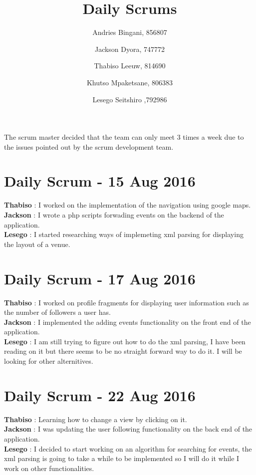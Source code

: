 \documentclass[10pt,a4paper]{article}
\title{Daily Scrums}
\author{
  Andries Bingani, 856807 \and
  Jackson Dyora, 747772\and
  Thabiso Leeuw, 814690 \and
  Khutso Mpaketsane, 806383 \and
  Lesego Seitshiro ,792986
}
\begin{document}
\maketitle

The scrum master decided that the team can only meet 3 times a week due to the issues pointed out by the scrum development team.

\section{Daily Scrum - 15 Aug 2016}
\textbf{Thabiso} : I worked on the implementation of the navigation using google maps.\\

\textbf{Jackson} : I wrote a php scripts forwading events on the backend of the application.\\

\textbf{Lesego} : I started researching ways of implemeting xml parsing for displaying the layout of a venue.\\
\section{Daily Scrum - 17 Aug 2016}
\textbf{Thabiso} : I worked on profile fragments for displaying user information such as the number of followers a user has.\\

\textbf{Jackson} : I implemented the adding events functionality on the front end of the application.\\

\textbf{Lesego} : I am still trying to figure out how to do the xml parsing, I have been reading on it but there seems to be no straight forward way to do it. I will be looking for other alternitives.\\

\section{Daily Scrum - 22 Aug 2016}
\textbf{Thabiso} : Learning how to change a view by clicking on it.\\

\textbf{Jackson} : I was updating the user following functionality on the back end of the application.\\

\textbf{Lesego} : I decided to start working on an algorithm for searching for events, the xml parsing is going to take a while to be implemented so I will do it while I work on other functionalities.\\
\end{document}
